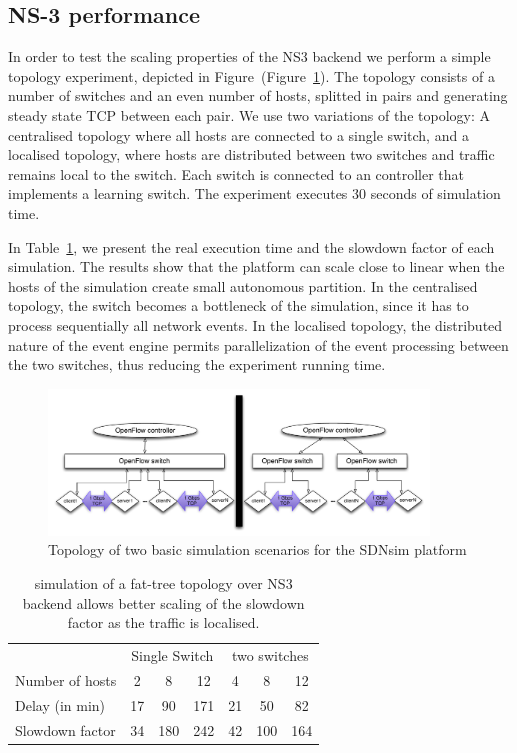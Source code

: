 \subsection{NS-3 performance} \label{sec:sdnsim-ns3-perf}

In order to test the scaling properties of the NS3 backend we perform a simple
topology experiment, depicted in Figure~(Figure~\ref{Haris-Fig2}). The topology
consists of a number of switches and an even number of hosts, splitted in pairs and generating steady
state TCP between each pair. We use two variations of the topology: A
centralised topology where all hosts are  connected to a single switch, and a
localised topology, where hosts are distributed between two switches and traffic
remains local to the switch. Each switch is connected to an \of controller that
implements a learning switch. The experiment executes 30 seconds of simulation
time.

In Table~\ref{Haris-Table1}, we present the real execution time and the slowdown
factor of each simulation.  The results show that the platform can scale close
to linear when the hosts of the simulation create small autonomous partition.
In the centralised topology, the \of switch becomes a bottleneck of the simulation,
since it has to process sequentially all network events. In the localised
topology, the distributed nature of the event engine permits
parallelization of the event processing between the two switches, thus reducing
the experiment running time.

\begin{figure}
\includegraphics[width=0.9\textwidth]{sdnsim-topology}
\caption{Topology of two basic simulation scenarios for the SDNsim platform}
\label{Haris-Fig2}
\end{figure}

\begin{table}
\label{Haris-Table1}
\begin{center}
\begin{tabular}{|l|c|c|c|c|c|c|} \hline
&\multicolumn{3}{|c|}{Single Switch} & \multicolumn{3}{|c|}{two switches} \\
\cline{2-7}
Number of hosts & 2 & 8 & 12 & 4 & 8 & 12 \\
\hline 
Delay (in min) & 17 & 90 & 171 & 21 &50 & 82 \\
\hline
Slowdown factor & 34 & 180 & 242 & 42 & 100 & 164 \\
\hline 
\end{tabular}
\end{center}
\caption{\sdnsim simulation of a fat-tree topology over NS3 backend allows
  better scaling of the slowdown factor as the traffic is localised. }
\end{table}

